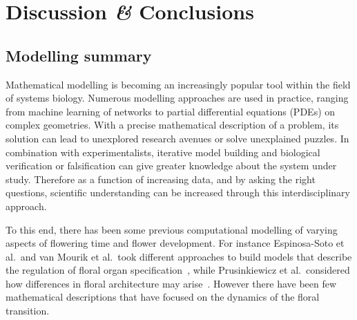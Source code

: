 \chapter{Discussion \emph{\&} Conclusions}
\label{chapter:discussion}

\section{Modelling summary}
Mathematical modelling is becoming an increasingly popular tool within the field of systems biology.
Numerous modelling approaches are used in practice, ranging from machine learning of networks to partial differential equations (PDEs) on complex geometries.
With a precise mathematical description of a problem, its solution can lead to unexplored research avenues or solve unexplained puzzles.
In combination with experimentalists, iterative model building and biological verification or falsification can give greater knowledge about the system under study.
Therefore as a function of increasing data, and by asking the right questions, scientific understanding can be increased through this interdisciplinary approach.

To this end, there has been some previous computational modelling of varying aspects of flowering time and flower development.
For instance Espinosa-Soto et al.\ and van Mourik et al.\ took different approaches to build models that describe the regulation of floral organ specification~\cite{espinosa2004,vanmourik2010}, while Prusinkiewicz et al.\ considered how differences in floral architecture may arise~\cite{prusinkiewicz2007}.
However there have been few mathematical descriptions that have focused on the dynamics of the floral transition.


